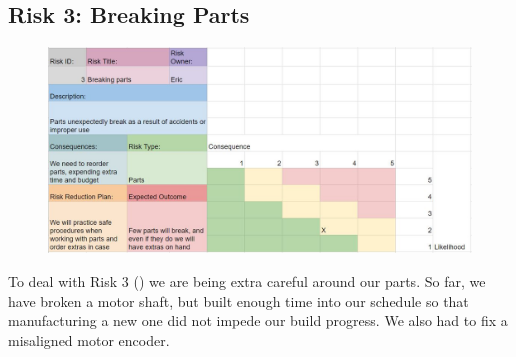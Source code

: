 \subsection{Risk 3: Breaking Parts}
\begin{figure}[h!]
\centering
\includegraphics[width=0.98\columnwidth]{risks/risk3.JPG}
\label{fig:risk3}
\end{figure}
To deal with Risk 3 () we are being extra careful around our parts. So far, we have broken a motor shaft, but built enough time into our schedule so that manufacturing a new one did not impede our build progress. We also had to fix a misaligned motor encoder.

